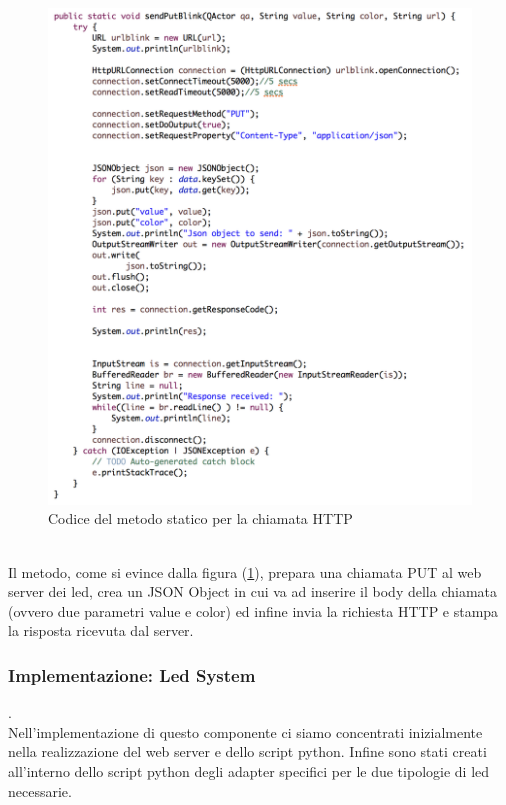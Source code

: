 \documentclass{llncs}
\begin{document}
\begin{figure}
    \centering
    \includegraphics[width=1\textwidth]{Immagini/Requisito4/ClientRest.png}
    \caption{Codice del metodo statico per la chiamata HTTP}
    \label{fig:CodeClientRestReq4}
\end{figure}
\vspace*{1ex}
\pagebreak
\\
Il metodo, come si evince dalla figura (\hyperref[fig:CodeClientRestReq4]{\ref{fig:CodeClientRestReq4}}), prepara una chiamata PUT al web server dei led, crea un JSON Object in cui va ad inserire il body della chiamata (ovvero due parametri value e color) ed infine invia la richiesta HTTP e stampa la risposta ricevuta dal server.
\subsubsection{Implementazione: Led System} .
\label{ImplementazioneReq4LedSystem}
\vspace*{1ex}
\\
Nell'implementazione di questo componente ci siamo concentrati inizialmente nella realizzazione del web server e dello script python. Infine sono stati creati all'interno dello script python degli adapter specifici per le due tipologie di led necessarie.
\end{document}
